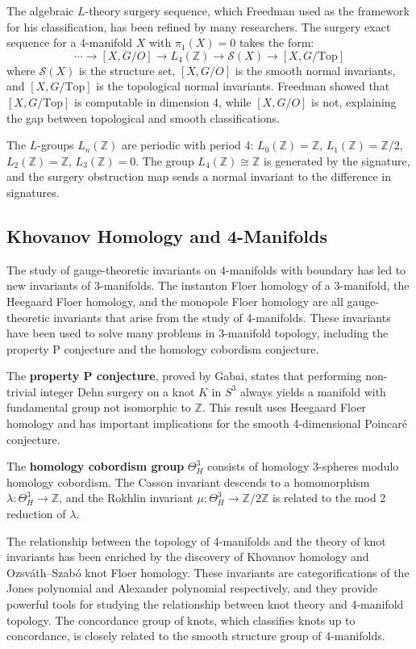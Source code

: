 The algebraic $L$-theory surgery sequence, which Freedman used as the framework for his classification, has been refined by many researchers. The surgery exact sequence for a 4-manifold $X$ with $\pi_1(X) = 0$ takes the form:
\[
\cdots \to [X, G/O] \to L_4(\mathbb{Z}) \to \mathcal{S}(X) \to [X, G/\text{Top}]
\]
where $\mathcal{S}(X)$ is the structure set, $[X, G/O]$ is the smooth normal invariants, and $[X, G/\text{Top}]$ is the topological normal invariants. Freedman showed that $[X, G/\text{Top}]$ is computable in dimension 4, while $[X, G/O]$ is not, explaining the gap between topological and smooth classifications.

The $L$-groups $L_n(\mathbb{Z})$ are periodic with period 4: $L_0(\mathbb{Z}) = \mathbb{Z}$, $L_1(\mathbb{Z}) = \mathbb{Z}/2$, $L_2(\mathbb{Z}) = \mathbb{Z}$, $L_3(\mathbb{Z}) = 0$. The group $L_4(\mathbb{Z}) \cong \mathbb{Z}$ is generated by the signature, and the surgery obstruction map sends a normal invariant to the difference in signatures.

\subsection*{Khovanov Homology and 4-Manifolds}

The study of gauge-theoretic invariants on 4-manifolds with boundary has led to new invariants of 3-manifolds. The instanton Floer homology of a 3-manifold, the Heegaard Floer homology, and the monopole Floer homology are all gauge-theoretic invariants that arise from the study of 4-manifolds. These invariants have been used to solve many problems in 3-manifold topology, including the property P conjecture and the homology cobordism conjecture.

The \textbf{property P conjecture}, proved by Gabai, states that performing non-trivial integer Dehn surgery on a knot $K$ in $S^3$ always yields a manifold with fundamental group not isomorphic to $\mathbb{Z}$. This result uses Heegaard Floer homology and has important implications for the smooth 4-dimensional Poincaré conjecture.

The \textbf{homology cobordism group} $\Theta^3_H$ consists of homology 3-spheres modulo homology cobordism. The Casson invariant descends to a homomorphism $\lambda: \Theta^3_H \to \mathbb{Z}$, and the Rokhlin invariant $\mu: \Theta^3_H \to \mathbb{Z}/2\mathbb{Z}$ is related to the mod 2 reduction of $\lambda$.

The relationship between the topology of 4-manifolds and the theory of knot invariants has been enriched by the discovery of Khovanov homology and Ozsv\'ath--Szab\'o knot Floer homology. These invariants are categorifications of the Jones polynomial and Alexander polynomial respectively, and they provide powerful tools for studying the relationship between knot theory and 4-manifold topology. The concordance group of knots, which classifies knots up to concordance, is closely related to the smooth structure group of 4-manifolds.

